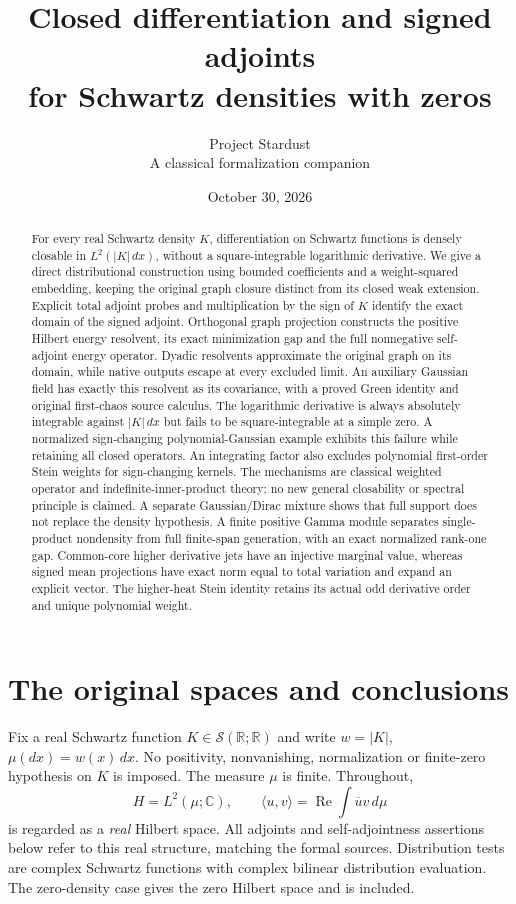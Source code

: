 \documentclass[11pt]{article}
\title{Closed differentiation and signed adjoints\\for Schwartz densities with zeros}
\author{Project Stardust\\\small A classical formalization companion}
\date{October 30, 2026}
\newcommand{\R}{\mathbb R}\newcommand{\C}{\mathbb C}
\newcommand{\Sc}{\mathcal S}\newcommand{\ip}[2]{\langle #1,#2\rangle}
\begin{document}
\maketitle
\begin{abstract}
For every real Schwartz density $K$, differentiation on Schwartz
functions is densely closable in $L^2(|K|\,dx)$, without a
square-integrable logarithmic derivative. We give a direct
distributional construction using bounded coefficients and a
weight-squared embedding, keeping the original graph closure
distinct from its closed weak extension. Explicit total adjoint
probes and multiplication by the sign of $K$ identify the exact
domain of the signed adjoint. Orthogonal graph projection constructs
the positive Hilbert energy resolvent, its exact minimization gap
and the full nonnegative self-adjoint energy operator. Dyadic resolvents approximate the original graph on its domain, while native outputs escape at every excluded limit. An auxiliary Gaussian
field has exactly this resolvent as its covariance, with a proved Green
identity and original first-chaos source calculus. The
logarithmic derivative is always absolutely integrable against
$|K|\,dx$ but fails to be square-integrable at a simple zero.
A normalized sign-changing polynomial-Gaussian example exhibits
this failure while retaining all closed operators. An integrating
factor also excludes polynomial first-order Stein weights for
sign-changing kernels. The mechanisms are classical weighted
operator and indefinite-inner-product theory; no new general
closability or spectral principle is claimed. A separate Gaussian/Dirac
mixture shows that full support does not replace the density hypothesis.
A finite positive Gamma module separates single-product nondensity from
full finite-span generation, with an exact normalized rank-one gap.
Common-core higher derivative jets have an injective marginal value,
whereas signed mean projections have exact norm equal to total variation
and expand an explicit vector. The higher-heat Stein identity retains
its actual odd derivative order and unique polynomial weight.
\end{abstract}

\section{The original spaces and conclusions}
Fix a real Schwartz function $K\in\Sc(\R;\R)$ and write
$w=|K|$, $\mu(dx)=w(x)\,dx$. No positivity, nonvanishing,
normalization or finite-zero hypothesis on $K$ is imposed.
The measure $\mu$ is finite. Throughout,
\[
 H=L^2(\mu;\C),\qquad
 \ip uv=\operatorname{Re}\int\overline{u}v\,d\mu
\]
is regarded as a \emph{real} Hilbert space. All adjoints and
self-adjointness assertions below refer to this real structure,
matching the formal sources. Distribution tests are complex Schwartz
functions with complex bilinear distribution evaluation.
The zero-density case gives the zero Hilbert space and is included.
\end{document}
